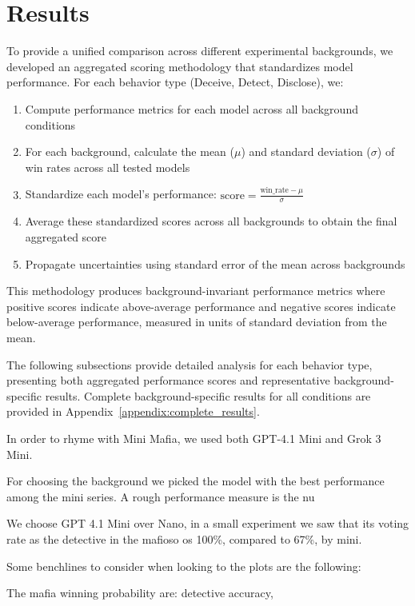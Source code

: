 \documentclass{article}
\begin{document}
\section{Results}

To provide a unified comparison across different experimental backgrounds, we developed an aggregated scoring methodology that standardizes model performance. For each behavior type (Deceive, Detect, Disclose), we:

\begin{enumerate}
    \item Compute performance metrics for each model across all background conditions
    \item For each background, calculate the mean ($\mu$) and standard deviation ($\sigma$) of win rates across all tested models
    \item Standardize each model's performance: $\text{score} = \frac{\text{win\_rate} - \mu}{\sigma}$
    \item Average these standardized scores across all backgrounds to obtain the final aggregated score
    \item Propagate uncertainties using standard error of the mean across backgrounds
\end{enumerate}

This methodology produces background-invariant performance metrics where positive scores indicate above-average performance and negative scores indicate below-average performance, measured in units of standard deviation from the mean.

The following subsections provide detailed analysis for each behavior type, presenting both aggregated performance scores and representative background-specific results. Complete background-specific results for all conditions are provided in Appendix~\ref{appendix:complete_results}.

In order to rhyme with Mini Mafia, we used both GPT-4.1 Mini and Grok 3 Mini.

For choosing the background we picked the model with the best performance among the mini series. A rough performance measure is the nu

We choose GPT 4.1 Mini over Nano, in a small experiment we saw that its voting rate as the detective in the mafioso os 100\%, compared to 67\%, by mini.



Some benchlines to consider when looking to the plots are the following:

The mafia winning probability are: detective accuracy, 
\end{document}
